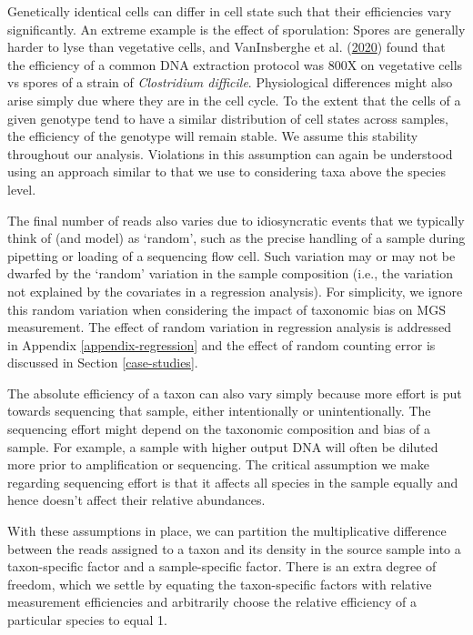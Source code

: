 \documentclass[
]{article}
\begin{document}
Genetically identical cells can differ in cell state such that their efficiencies vary significantly.
An extreme example is the effect of sporulation: Spores are generally harder to lyse than vegetative cells, and VanInsberghe et al. (\protect\hyperlink{ref-vaninsberghe2020diar}{2020}) found that the efficiency of a common DNA extraction protocol was 800X on vegetative cells vs spores of a strain of \emph{Clostridium difficile}.
Physiological differences might also arise simply due where they are in the cell cycle.
To the extent that the cells of a given genotype tend to have a similar distribution of cell states across samples, the efficiency of the genotype will remain stable.
We assume this stability throughout our analysis.
Violations in this assumption can again be understood using an approach similar to that we use to considering taxa above the species level.

The final number of reads also varies due to idiosyncratic events that we typically think of (and model) as `random', such as the precise handling of a sample during pipetting or loading of a sequencing flow cell.
Such variation may or may not be dwarfed by the `random' variation in the sample composition (i.e., the variation not explained by the covariates in a regression analysis).
For simplicity, we ignore this random variation when considering the impact of taxonomic bias on MGS measurement.
The effect of random variation in regression analysis is addressed in Appendix \ref{appendix-regression} and the effect of random counting error is discussed in Section \ref{case-studies}.

The absolute efficiency of a taxon can also vary simply because more effort is put towards sequencing that sample, either intentionally or unintentionally.
The sequencing effort might depend on the taxonomic composition and bias of a sample.
For example, a sample with higher output DNA will often be diluted more prior to amplification or sequencing.
The critical assumption we make regarding sequencing effort is that it affects all species in the sample equally and hence doesn't affect their relative abundances.

With these assumptions in place, we can partition the multiplicative difference between the reads assigned to a taxon and its density in the source sample into a taxon-specific factor and a sample-specific factor.
There is an extra degree of freedom, which we settle by equating the taxon-specific factors with relative measurement efficiencies and arbitrarily choose the relative efficiency of a particular species to equal 1.
\end{document}
